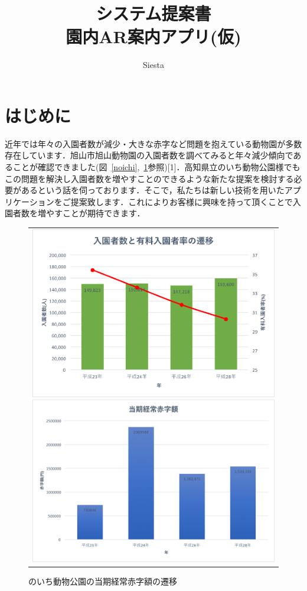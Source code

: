 \documentclass[a4j]{jarticle}
\title{
\vspace{30mm}
{\bf システム提案書} 
\\
\vspace{5mm}
{\bf 園内AR案内アプリ(仮)}
\vspace{90mm}
}
\author{
\vspace{5mm}
Siesta \\
}
\begin{document}
\maketitle

\newpage

\tableofcontents

\newpage

\section{はじめに}
近年では年々の入園者数が減少・大きな赤字など問題を抱えている動物園が多数存在しています．旭山市旭山動物園の入園者数を調べてみると年々減少傾向であることが確認できました(図~\ref{noichi},~\ref{noichi_akaji}参照)[1]．高知県立のいち動物公園様でもこの問題を解決し入園者数を増やすことのできるような新たな提案を検討する必要があるという話を伺っております．そこで，私たちは新しい技術を用いたアプリケーションをご提案致します．これによりお客様に興味を持って頂くことで入園者数を増やすことが期待できます．

\begin{figure}[htb]
	\begin{center}
		\begin{tabular}{c}
			\begin{minipage}{0.5\hsize}
				\begin{center}
					\includegraphics[width=0.6 \linewidth]{noichi.png}
					\caption{のいち動物公園の入園者数の遷移}
					\label{noichi}
				\end{center}
			\end{minipage}
			\begin{minipage}{0.5\hsize}
				\begin{center}
					\includegraphics[width=0.6 \linewidth]{noichi_akaji.png}
					\caption{のいち動物公園の当期経常赤字額の遷移}
					\label{noichi_akaji}
				\end{center}
			\end{minipage}
		\end{tabular}
	\end{center}
\end{figure}
\end{document}
